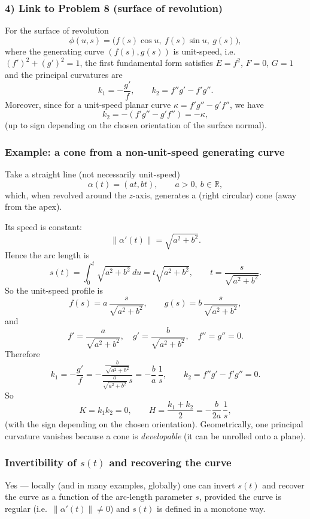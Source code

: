 \documentclass[12pt,a4paper]{article}
\theoremstyle{plain}
\theoremstyle{definition}      %
\begin{document}
\subsubsection*{4) Link to Problem 8 (surface of revolution)}
For the surface of revolution
\[
\phi(u,s)=\bigl(f(s)\cos u,\ f(s)\sin u,\ g(s)\bigr),
\]
where the generating curve $(f(s),g(s))$ is unit-speed, i.e.\ $(f')^2+(g')^2=1$,
the first fundamental form satisfies $E=f^2$, $F=0$, $G=1$ and the principal curvatures are
\[
k_1=-\frac{g'}{f},\qquad k_2=f''g'-f'g''.
\]
Moreover, since for a unit-speed planar curve $\kappa=f'g''-g'f''$, we have
\[
k_2=-(f'g''-g'f'')=-\kappa,
\]
(up to sign depending on the chosen orientation of the surface normal).

\subsubsection*{Example: a cone from a non-unit-speed generating curve}
Take a straight line (not necessarily unit-speed)
\[
\alpha(t)=(at,bt),\qquad a>0,\ b\in\mathbb R,
\]
which, when revolved around the $z$-axis, generates a (right circular) cone (away from the apex).

Its speed is constant:
\[
\|\alpha'(t)\|=\sqrt{a^2+b^2}.
\]
Hence the arc length is
\[
s(t)=\int_0^t \sqrt{a^2+b^2}\,du=t\sqrt{a^2+b^2},
\qquad
t=\frac{s}{\sqrt{a^2+b^2}}.
\]
So the unit-speed profile is
\[
f(s)=a\,\frac{s}{\sqrt{a^2+b^2}},\qquad
g(s)=b\,\frac{s}{\sqrt{a^2+b^2}},
\]
and
\[
f'=\frac{a}{\sqrt{a^2+b^2}},\quad g'=\frac{b}{\sqrt{a^2+b^2}},\quad f''=g''=0.
\]
Therefore
\[
k_1=-\frac{g'}{f}=-\frac{\frac{b}{\sqrt{a^2+b^2}}}{\frac{a}{\sqrt{a^2+b^2}}\,s}
=-\frac{b}{a}\,\frac{1}{s},
\qquad
k_2=f''g'-f'g''=0.
\]
So
\[
K=k_1k_2=0,\qquad
H=\frac{k_1+k_2}{2}=-\frac{b}{2a}\,\frac{1}{s},
\]
(with the sign depending on the chosen orientation).  Geometrically, one principal curvature
vanishes because a cone is \emph{developable} (it can be unrolled onto a plane).

	
	\subsubsection*{Invertibility of $s(t)$ and recovering the curve}
	
	Yes --- locally (and in many examples, globally) one can invert $s(t)$ and recover the curve as a
	function of the arc-length parameter $s$, provided the curve is regular (i.e.\ $\|\alpha'(t)\|\neq 0$)
	and $s(t)$ is defined in a monotone way.
	
\end{document}

